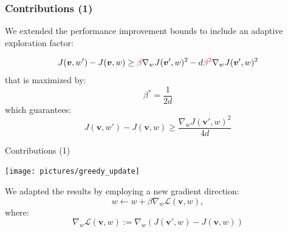 \documentclass{beamer}
\newcommand{\vtheta}{{\boldsymbol{\theta}}}
\newcommand{\vv}{\boldsymbol{v}}
\newcommand{\Deltav}{\mathcal{L}}
\newcommand{\gradDelta}[1][w]{\nabla_{#1}\Deltav}
\newenvironment{tightcenter}{%
  \setlength\topsep{0pt}
  \setlength\parskip{0pt}
  \begin{center}
}{%
  \end{center}
}
\begin{document}
%
%
%
%

\begin{frame}
\frametitle{Contributions (1)}
We extended the performance improvement bounds to include an adaptive exploration factor:

\[
J(\vv, w') - J(\vv, w) \geq \textcolor{red}{\beta} \nabla_w J(\vv',w)^2 - d \textcolor{red}{\beta^2} \nabla_w J(\vv',w)^2
\]
that is maximized by:
\[
\beta^* = \frac{1}{2d}
\]
which guarantees:
\[
J(\vv, w') - J(\vv, w) \geq \frac{\nabla_w J(\vv',w)^2}{4d}
\]

\framebox{\begin{minipage}{4cm}\textbf{Recall:}\begin{tightcenter} $\vtheta = [ \vv ; w ]$ \end{tightcenter} \end{minipage}}



\end{frame}




\begin{frame}{Contributions (1)}
\begin{tightcenter}
\texttt{[image: pictures/greedy\_update]}
\end{tightcenter}

We adapted the results by employing a new gradient direction: 
\[
w \gets w + \beta \gradDelta(\vv, w),
\]
where: 
\[
\gradDelta(\vv, w) := \nabla_w \left( J(\vv', w) - J(\vv, w) \right)
\]
\end{frame}
\end{document}
